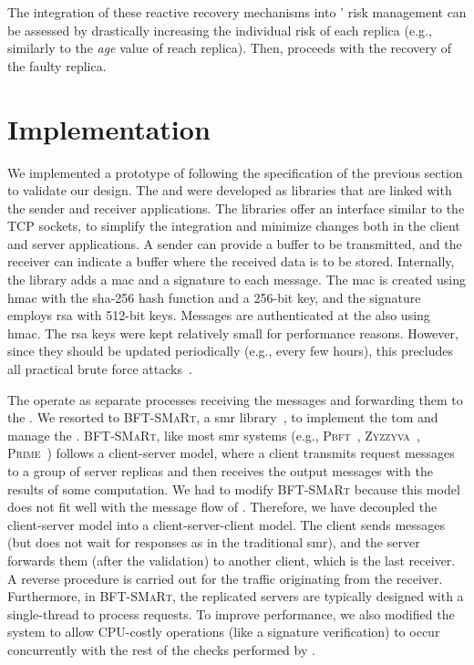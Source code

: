 The integration of these reactive recovery mechanisms into \system' risk management can be assessed by drastically increasing the individual risk of each replica (e.g., similarly to the \emph{age} value of reach replica). 
Then, \system proceeds with the recovery of the faulty replica.


\section{Implementation}
\label{implementation}


We implemented a prototype of \sieveq following the specification of the previous section to validate our design.
The \sender and \postsieve were developed as libraries that are linked with the sender and receiver applications. 
The libraries offer an interface similar to the TCP sockets, to simplify the integration and minimize changes both in the client and server applications. 
A sender can provide a buffer to be transmitted, and the receiver can indicate a buffer where the received data is to be stored.
Internally, the \sender library adds a \gls{mac} and a signature to each message. 
The \gls{mac} is created using \gls{hmac} with the \gls{sha}-256 hash function and a 256-bit key, and the signature employs \gls{rsa} with 512-bit keys. 
Messages are authenticated at the \postsieve also using \gls{hmac}. 
The \gls{rsa} keys were kept relatively small for performance reasons. 
However, since they should be updated periodically (e.g., every few hours), this precludes all practical brute force attacks~\cite{David:2015}.%

The \presieves operate as separate processes receiving the messages and forwarding them to the \repsieves.
We resorted to \textsc{BFT-SMaRt}, a \gls{smr} library~\cite{Bessani:2014}, to implement the \gls{tom} and manage the \repsieves.
\textsc{BFT-SMaRt}, like most \gls{smr} systems (e.g., \textsc{Pbft}~\cite{Castro:2002}, \textsc{Zyzzyva}~\cite{Kotla:2010}, \textsc{Prime}~\cite{Amir:2011}) follows a client-server model, where a client transmits request messages to a group of server replicas and then receives the output messages with the results of some computation.
We had to modify \textsc{BFT-SMaRt} because this model does not fit well with the message flow of \sieveq.
Therefore, we have decoupled the client-server model into a client-server-client model.
The client sends messages (but does not wait for responses as in the traditional \gls{smr}), and the server forwards them (after the validation) to another client, which is the last receiver.
A reverse procedure is carried out for the traffic originating from the receiver.
Furthermore, in \textsc{BFT-SMaRt}, the replicated servers are typically designed with a single-thread to process requests.
To improve performance, we also modified the system to allow CPU-costly operations (like a signature verification) to occur concurrently with the rest of the checks performed by \repsieves.

